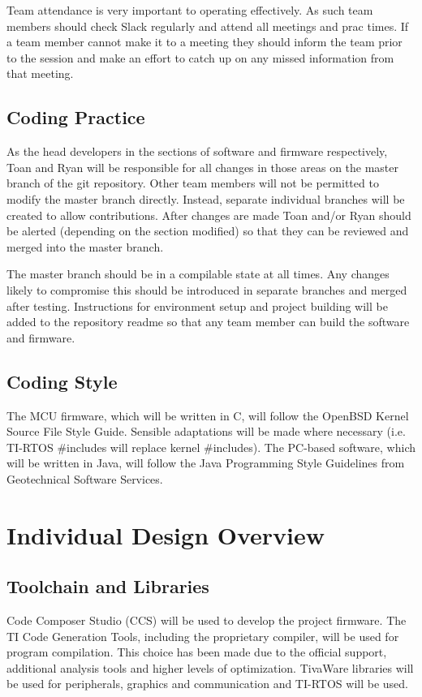 \documentclass[12pt]{report}
\begin{document}
Team attendance is very important to operating effectively. As such team members should check Slack regularly and attend all meetings and prac times. If a team member cannot make it to a meeting they should inform the team prior to the session and make an effort to catch up on any missed information from that meeting.
\section{Coding Practice}
As the head developers in the sections of software and firmware respectively, Toan and Ryan will be responsible for all changes in those areas on the master branch of the git repository. Other team members will not be permitted to modify the master branch directly. Instead, separate individual branches will be created to allow contributions. After changes are made Toan and/or Ryan should be alerted (depending on the section modified) so that they can be reviewed and merged into the master branch.

The master branch should be in a compilable state at all times. Any changes likely to compromise this should be introduced in separate branches and merged after testing. Instructions for environment setup and project building will be added to the repository readme so that any team member can build the software and firmware.

\section{Coding Style}
The MCU firmware, which will be written in C, will follow the OpenBSD Kernel Source File Style Guide\cite{CStyle}. Sensible adaptations will be made where necessary (i.e. TI-RTOS \#includes will replace kernel \#includes).
The PC-based software, which will be written in Java, will follow the Java Programming Style Guidelines from Geotechnical Software Services\cite{JavaStyle}. 

\chapter{Individual Design Overview}
\section{Toolchain and Libraries}
Code Composer Studio (CCS) will be used to develop the project firmware. The TI Code Generation Tools, including the proprietary compiler, will be used for program compilation. This choice has been made due to the official support, additional analysis tools and higher levels of optimization\cite{TICompilers}. TivaWare libraries will be used for peripherals, graphics and communication and TI-RTOS will be used.
\end{document}
